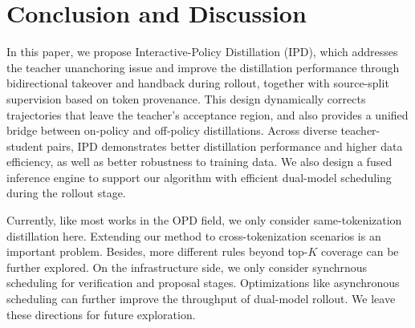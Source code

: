 \documentclass{article} %
\begin{document}
\section{Conclusion and Discussion}
In this paper, we propose Interactive-Policy Distillation (IPD), which addresses the teacher unanchoring issue and improve the distillation performance through bidirectional takeover and handback during rollout, together with source-split supervision based on token provenance. This design dynamically corrects trajectories that leave the teacher's acceptance region, and also provides a unified bridge between on-policy and off-policy distillations. Across diverse teacher-student pairs, IPD demonstrates better distillation performance and higher data efficiency, as well as better robustness to training data. We also design a fused inference engine to support our algorithm with efficient dual-model scheduling during the rollout stage.

Currently, like most works in the OPD field, we only consider same-tokenization distillation here. Extending our method to cross-tokenization scenarios is an important problem. Besides, more different rules beyond top-$K$ coverage can be further explored. On the infrastructure side, we only consider synchrnous scheduling for verification and proposal stages. Optimizations like asynchronous scheduling can further improve the throughput of dual-model rollout. We leave these directions for future exploration.




\end{document}
